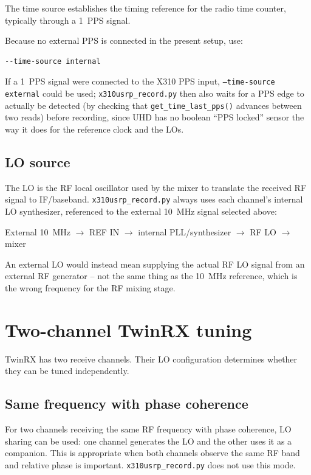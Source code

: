 \documentclass[11pt,a4paper]{article}
\begin{document}
The time source establishes the timing reference for the radio time counter, typically through a 1~PPS signal.

Because no external PPS is connected in the present setup, use:

\begin{lstlisting}[language=bash]
--time-source internal
\end{lstlisting}

If a 1~PPS signal were connected to the X310 PPS input, \texttt{--time-source external} could be used; \texttt{x310usrp\_record.py} then also waits for a PPS edge to actually be detected (by checking that \texttt{get\_time\_last\_pps()} advances between two reads) before recording, since UHD has no boolean ``PPS locked'' sensor the way it does for the reference clock and the LOs.

\subsection{LO source}

The LO is the RF local oscillator used by the mixer to translate the received RF signal to IF/baseband. \texttt{x310usrp\_record.py} always uses each channel's internal LO synthesizer, referenced to the external 10~MHz signal selected above:

\begin{center}
External 10~MHz $\rightarrow$ REF IN $\rightarrow$ internal PLL/synthesizer $\rightarrow$ RF LO $\rightarrow$ mixer
\end{center}

An external LO would instead mean supplying the actual RF LO signal from an external RF generator -- not the same thing as the 10~MHz reference, which is the wrong frequency for the RF mixing stage.

\section{Two-channel TwinRX tuning}

TwinRX has two receive channels. Their LO configuration determines whether they can be tuned independently.

\subsection{Same frequency with phase coherence}

For two channels receiving the same RF frequency with phase coherence, LO sharing can be used: one channel generates the LO and the other uses it as a companion. This is appropriate when both channels observe the same RF band and relative phase is important. \texttt{x310usrp\_record.py} does not use this mode.
\end{document}
